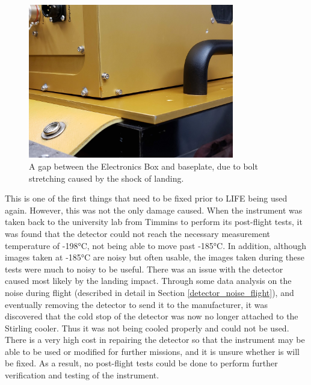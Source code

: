 \begin{figure}
    \centering
    \includegraphics[width=0.8\textwidth]{chap4_images/LIFE_impact_result.jpg}
    \caption{A gap between the Electronics Box and baseplate, due to bolt stretching caused by the shock of landing.}
    \label{fig:landing_damage_image}
\end{figure}

This is one of the first things that need to be fixed prior to LIFE being used again. However, this was not the only damage caused. When the instrument was taken back to the university lab from Timmins to perform its post-flight tests, it was found that the detector could not reach the necessary measurement temperature of -198°C, not being able to move past -185°C. In addition, although images taken at -185°C are noisy but often usable, the images taken during these tests were much to noisy to be useful. There was an issue with the detector caused most likely by the landing impact. Through some data analysis on the noise during flight (described in detail in Section \ref{detector_noise_flight}), and eventually removing the detector to send it to the manufacturer, it was discovered that the cold stop of the detector was now no longer attached to the Stirling cooler. Thus it was not being cooled properly and could not be used. There is a very high cost in repairing the detector so that the instrument may be able to be used or modified for further missions, and it is unsure whether is will be fixed. As a result, no post-flight tests could be done to perform further verification and testing of the instrument.

